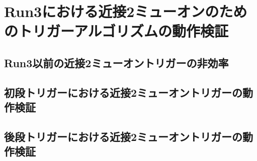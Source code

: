 \chapter{Run3における近接2ミューオンのためのトリガーアルゴリズムの動作検証}\label{chapter5}

\section{Run3以前の近接2ミューオントリガーの非効率}\label{5-1}

\section{初段トリガーにおける近接2ミューオントリガーの動作検証}\label{5-2}

\section{後段トリガーにおける近接2ミューオントリガーの動作検証}\label{5-3}
